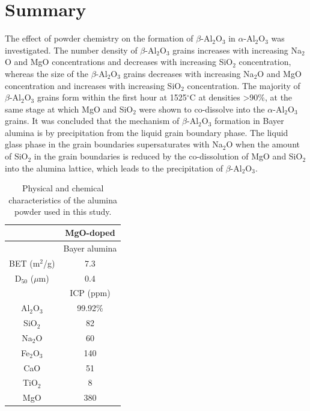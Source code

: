 \section{Summary}
The effect of powder chemistry on the formation of $\beta$-Al$_{2}$O$_{3}$ in $\alpha$-Al$_{2}$O$_{3}$ was investigated. The number density of $\beta$-Al$_{2}$O$_{3}$ grains increases with increasing Na$_{2}$O and MgO concentrations and decreases with increasing SiO$_{2}$ concentration, whereas the size of the $\beta$-Al$_{2}$O$_{3}$ grains decreases with increasing Na$_{2}$O and MgO concentration and increases with increasing SiO$_{2}$ concentration. The majority of $\beta$-Al$_{2}$O$_{3}$ grains form within the first hour at 1525$^{\circ}$C at densities >90\%, at the same stage at which MgO and SiO$_{2}$ were shown to co-dissolve into the $\alpha$-Al$_{2}$O$_{3}$ grains. It was concluded that the mechanism of $\beta$-Al$_{2}$O$_{3}$ formation in Bayer alumina is by precipitation from the liquid grain boundary phase. The liquid glass phase in the grain boundaries supersaturates with Na$_{2}$O when the amount of SiO$_{2}$ in the grain boundaries is reduced by the co-dissolution of MgO and SiO$_{2}$ into the alumina lattice, which leads to the precipitation of $\beta$-Al$_{2}$O$_{3}$.


\newpage
\begin{table}[H]
	\caption{Physical and chemical characteristics of the alumina powder used in this study.}
	\centering
	\begin{tabular}{ | c | c | }
		\hline
		& MgO-doped \\
		\hline
		& Bayer alumina \\
		\hline
		BET (m$^{2}$/g) & 7.3 \\
		\hline
		D$_{50}$ ($\mu$m) & 0.4 \\
		\hline
		& ICP (ppm) \\
		\hline
		Al$_{2}$O$_{3}$ & 99.92\%\\
		\hline
		SiO$_{2}$ & 82\\
		\hline
		Na$_{2}$O & 60\\
		\hline
		Fe$_{2}$O$_{3}$ & 140 \\
		\hline
		CaO & 51 \\
		\hline
		TiO$_{2}$ & 8 \\
		\hline
		MgO & 380\\
		\hline
	\end{tabular}
	\label{Ch5-table:table1}
\end{table}
\clearpage

